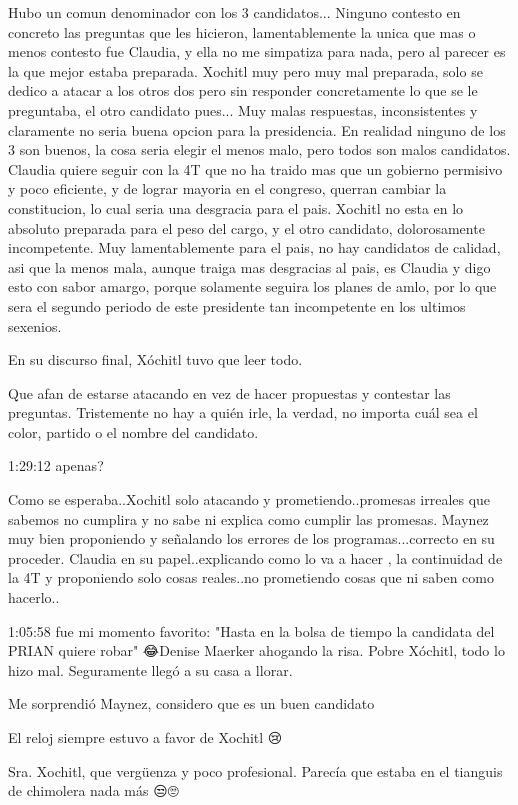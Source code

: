 Hubo un comun denominador con los 3 candidatos... Ninguno contesto en concreto las preguntas que les hicieron, lamentablemente la unica que mas o menos contesto fue Claudia, y ella no me simpatiza para nada, pero al parecer es la que mejor estaba preparada. Xochitl muy pero muy mal preparada, solo se dedico a atacar a los otros dos pero sin responder concretamente lo que se le preguntaba, el otro candidato pues... Muy malas respuestas, inconsistentes y claramente no seria buena opcion para la presidencia. En realidad ninguno de los 3 son buenos, la cosa seria elegir el menos malo, pero todos son malos candidatos. Claudia quiere seguir con la 4T que no ha traido mas que un gobierno permisivo y poco eficiente, y de lograr mayoria en el congreso, querran cambiar la constitucion, lo cual seria una desgracia para el pais. Xochitl no esta en lo absoluto preparada para el peso del cargo, y el otro candidato, dolorosamente incompetente. Muy lamentablemente para el pais, no hay candidatos de calidad, asi que la menos mala, aunque traiga mas desgracias al pais, es Claudia y digo esto con sabor amargo, porque solamente seguira los planes de amlo, por lo que sera el segundo periodo de este presidente tan incompetente en los ultimos sexenios.

En su discurso final, Xóchitl tuvo que leer todo.

Que afan de estarse atacando en vez de hacer propuestas y contestar las preguntas. Tristemente no hay a quién irle, la verdad, no importa cuál sea el color, partido o el nombre del candidato.

1:29:12 apenas?

Como se esperaba..Xochitl solo atacando y prometiendo..promesas irreales que sabemos no cumplira y no sabe ni explica como cumplir las promesas.
Maynez muy bien proponiendo y señalando los errores de los programas...correcto en su proceder.
Claudia en su papel..explicando como lo va a hacer , la continuidad de la 4T y proponiendo solo cosas reales..no prometiendo cosas que ni saben como hacerlo..

1:05:58 fue mi momento favorito: "Hasta en la bolsa de tiempo la candidata del PRIAN quiere robar" 😂Denise Maerker ahogando la risa. Pobre Xóchitl, todo lo hizo mal. Seguramente llegó a su casa a llorar.

Me sorprendió Maynez, considero que es un buen candidato

El reloj siempre estuvo a favor de Xochitl 😢

Sra. Xochitl, que vergüenza y poco profesional. Parecía que estaba en el tianguis de chimolera nada más 😒🙄🫤

